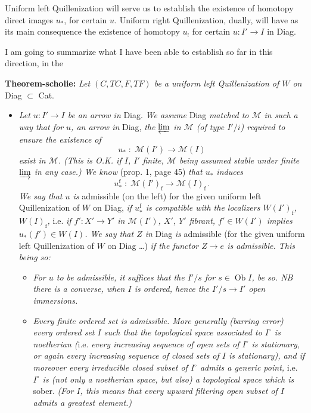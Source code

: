 Uniform left Quillenization will serve us to establish the existence of homotopy direct images $u_{*}$, for certain $u$. Uniform right Quillenization, dually, will have as its main consequence the existence of homotopy $u_{!}$ for certain $u : I' \longrightarrow I$ in Diag.

I am going to summarize what I have been able to establish so far in this direction, in the

\textbf{Theorem-scholie:} \textit{Let $(C,TC,F,TF)$ be a uniform left Quillenization of $W$ on} Diag $\subset$ Cat.

\begin{itemize}[leftmargin=3em]
\item[1)] \textit{Let $u : I' \longrightarrow I$ be an arrow in} Diag. \textit{We assume} Diag \textit{matched to $\mathcal{M}$ in such a way that for $u$, an arrow in} Diag, \textit{the $\varprojlim$ in $\mathcal{M}$ (of type $I'/i$) required to ensure the existence of}
\[ u_{*} \;:\; \mathcal{M}(I') \longrightarrow \mathcal{M}(I) \]
\textit{exist in $\mathcal{M}$. (This is O.K. if $I$, $I'$} \textit{finite, $\mathcal{M}$ being assumed stable under finite $\varinjlim$ in any case.) We know} (prop. 1, page 45) \textit{that $u_{*}$ induces}
\[ u_{*}^{\mathrm{f}} \;:\; \mathcal{M}(I')_{\mathrm{f}} \longrightarrow \mathcal{M}(I)_{\mathrm{f}}\,. \tag*{$(*)$} \]
\textit{We say that $u$ is} admissible (on the left) for the given uniform left Quillenization of $W$ on Diag, \textit{if $u_{*}^{\mathrm{f}}$ is compatible with the localizers $W(I')_{\mathrm{f}}$, $W(I)_{\mathrm{f}}$,} i.e. \textit{if $f' : X' \longrightarrow Y'$ in $\mathcal{M}(I')$, $X'$, $Y'$ fibrant, $f' \in W(I')$ implies $u_{*}(f') \in W(I)$. We say that $Z$ in} Diag \textit{is} admissible (for the given uniform left Quillenization of $W$ on Diag \dots) \textit{if the functor $Z \longrightarrow e$ is admissible. This being so:}
\begin{itemize}[leftmargin=2.5em]
\item[a)] \textit{For $u$ to be admissible, it suffices that the $I'/s$ for $s \in \operatorname{Ob} I$, be so. NB there is a converse, when $I$ is ordered, hence the $I'/s \longrightarrow I'$ open immersions.}
\item[b)] \textit{Every finite ordered set is admissible. More generally (barring error) every ordered set $I$ such that the topological space associated to $I^{\circ}$ is noetherian (}i.e. \textit{every increasing sequence of open sets of $I^{\circ}$ is stationary, or again every increasing sequence of closed sets of $I$ is stationary), and if moreover every irreducible closed subset of $I^{\circ}$ admits a generic point,} i.e. \textit{$I^{\circ}$ is (not only a noetherian space, but also) a topological space which is} sober. \textit{(For $I$, this means that every upward filtering open subset of $I$ admits a greatest element.)} %
\end{itemize}
\end{itemize}

